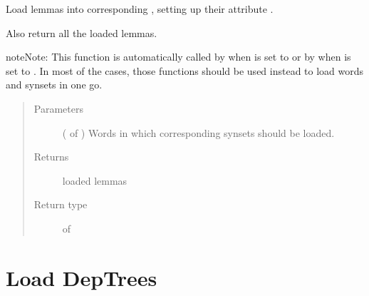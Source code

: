 \documentclass[letterpaper,10pt,english]{sphinxmanual}
\begin{document}
\begin{fulllineitems}
\label{\detokenize{load:loacore.load.lemma_load.load_lemmas_in_words}}
Load lemmas into corresponding , setting up their attribute .

Also return all the loaded lemmas.

\begin{sphinxadmonition}{note}{Note:}
This function is automatically called by  when  is set to
 or by  when  is set to .
In most of the cases, those functions should be used instead to load words and synsets in one go.
\end{sphinxadmonition}
\begin{quote}\begin{description}
\item[{Parameters}] \leavevmode
{} ( of {\hyperref[\detokenize{classes:loacore.classes.classes.Word}]{}}) \textendash{} Words in which corresponding synsets should be loaded.

\item[{Returns}] \leavevmode
loaded lemmas

\item[{Return type}] \leavevmode
{} of 

\end{description}\end{quote}

\end{fulllineitems}



\section{Load DepTrees}
\label{\detokenize{load:module-loacore.load.deptree_load}}\label{\detokenize{load:load-deptrees}}
\end{document}

